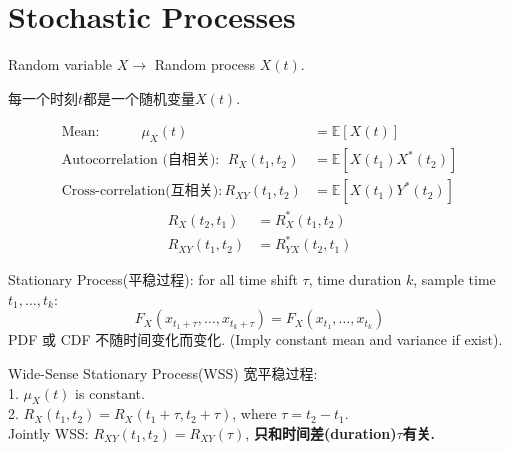 \section{Stochastic Processes}

Random variable $X\to$ Random process $X(t)$.

每一个时刻$t$都是一个随机变量$X(t)$.

\begin{align*}
\text{Mean:}\qquad\quad \mu_X(t) &= \mathbb{E}[X(t)] \\
\text{Autocorrelation (自相关)}:\ \ R_X(t_1,t_2) &= \mathbb{E}[X(t_1)X^*(t_2)] \\
\text{Cross-correlation(互相关)}: R_{XY}(t_1,t_2) &= \mathbb{E}[X(t_1)Y^*(t_2)]
\end{align*}
\begin{align*}
R_{X}(t_2,t_1) &= R_X^*(t_1,t_2) \\
R_{XY}(t_1,t_2) &= R_{YX}^*(t_2,t_1)
\end{align*}

\begin{definition}
Stationary Process(平稳过程): for all time shift $\tau$, time duration $k$, sample time $t_1,\ldots,t_k$:
$$F_X(x_{t_1+\tau},\ldots,x_{t_k+\tau}) = F_X(x_{t_1},\ldots,x_{t_k})$$
PDF 或 CDF 不随时间变化而变化. (Imply constant mean and variance if exist).
\end{definition}

\begin{definition}
Wide-Sense Stationary Process(WSS) 宽平稳过程: \\
1. $\mu_X(t)$ is constant. \\
2. $R_X(t_1,t_2) = R_X(t_1+\tau,t_2+\tau)$, where $\tau=t_2-t_1$. \\
Jointly WSS: $R_{XY}(t_1,t_2) = R_{XY}(\tau)$, \textbf{只和时间差(duration)$\tau$有关.}
\end{definition}